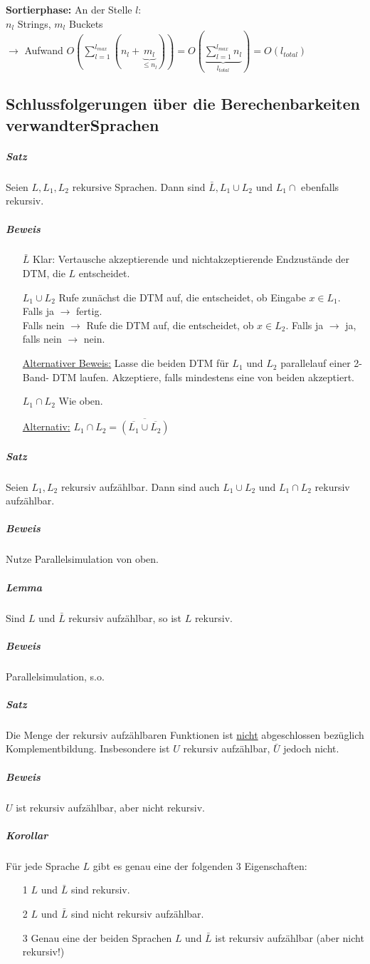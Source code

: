 \documentclass[fleqn]{scrartcl}
\begin{document}
\textbf{Sortierphase:} An der Stelle $l$:\\
$n_l$ Strings, $m_l$ Buckets\\
$\rightarrow$ Aufwand $O(\sum\limits_{l=1}^{l_{max}} (n_l + \underbrace{m_l}_{\leq n_l})) = O(\underbrace{\sum\limits_{l=1}^{l_{max}} n_l}_{l_{total}}) = O(l_{total})$

\subsection{Schlussfolgerungen über die Berechenbarkeiten \glqq verwandter\grqq Sprachen}
\subparagraph{Satz} Seien $L, L_1, L_2$ rekursive Sprachen. Dann sind $\bar{L}, L_1 \cup L_2$ und $L_1 \cap$ ebenfalls rekursiv.
\subparagraph{Beweis}
\begin{itemize}
\item[$\bar{L}$] Klar: Vertausche akzeptierende und nichtakzeptierende Endzustände der DTM, die $L$ entscheidet.
\item[$L_1\cup L_2$] Rufe zunächst die DTM auf, die entscheidet, ob Eingabe $x \in L_1$.\\
Falls ja $\rightarrow$ fertig.\\
Falls nein $\rightarrow$ Rufe die DTM auf, die entscheidet, ob $x \in L_2$. Falls ja $\rightarrow$ ja, falls nein $\rightarrow$ nein.

\underline{Alternativer Beweis:} Lasse die beiden DTM für $L_1$ und $L_2$ \glqq parallel\grqq auf einer 2- Band- DTM laufen. Akzeptiere, falls mindestens eine von beiden akzeptiert.
\item[$L_1 \cap L_2$] Wie oben.

\underline{Alternativ:} $L_1 \cap L_2 = \overline{(\overline{L_1} \cup \overline{L_2})}$
\end{itemize} 

\subparagraph{Satz} Seien $L_1, L_2$ rekursiv aufzählbar. Dann sind auch $L_1 \cup L_2$ und $L_1 \cap L_2$ rekursiv aufzählbar.
\subparagraph{Beweis} Nutze Parallelsimulation von oben.

\subparagraph{Lemma} Sind $L$ und $\bar{L}$ rekursiv aufzählbar, so ist $L$ rekursiv.
\subparagraph{Beweis} Parallelsimulation, s.o.

\subparagraph{Satz} Die Menge der rekursiv aufzählbaren Funktionen ist \underline{nicht} abgeschlossen bezüglich Komplementbildung. Insbesondere ist $U$ rekursiv aufzählbar, $\bar{U}$ jedoch nicht.
\subparagraph{Beweis} $U$ ist rekursiv aufzählbar, aber nicht rekursiv.

\subparagraph{Korollar} Für jede Sprache $L$ gibt es genau eine der folgenden 3 Eigenschaften:
\begin{itemize}
\item[1] $L$ und $\bar{L}$ sind rekursiv.
\item[2] $L$ und $\bar{L}$ sind nicht rekursiv aufzählbar.
\item[3] Genau eine der beiden Sprachen $L$ und $\bar{L}$ ist rekursiv aufzählbar (aber nicht rekursiv!)
\end{itemize}
\end{document}
